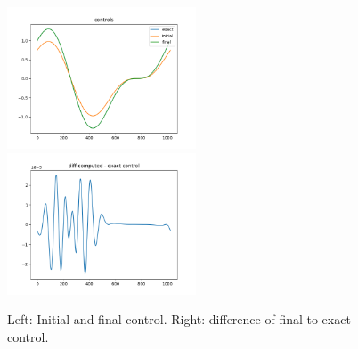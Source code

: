 \documentclass[a4paper]{article} %
\begin{document}
\begin{figure}
	\includegraphics[width=0.5\textwidth]{figures/ctrlKS_T1_nstep100_nx1024_u0_075uexact_progress.png}
	\includegraphics[width=0.5\textwidth]{figures/ctrlKS_T1_nstep100_nx1024_u0_075uexact_diff_final.png}
	\caption{Left: Initial and final control. Right: difference of final to exact control.}
		\label{fig:ctrl}
\end{figure}



\end{document}
